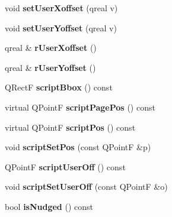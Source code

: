 \begin{DoxyCompactItemize}
\item 
\mbox{\label{class_ms_1_1_element_aca6f405281ab38a390561198ec0c6b19}} 
void {\bfseries set\+User\+Xoffset} (qreal v)
\item 
\mbox{\label{class_ms_1_1_element_a977093e21a1f1e361992ba095ba1359f}} 
void {\bfseries set\+User\+Yoffset} (qreal v)
\item 
\mbox{\label{class_ms_1_1_element_aab6ba028de833b5255ca6402e769d9a0}} 
qreal \& {\bfseries r\+User\+Xoffset} ()
\item 
\mbox{\label{class_ms_1_1_element_ac3a76ec2d191286d792e43e717791c08}} 
qreal \& {\bfseries r\+User\+Yoffset} ()
\item 
\mbox{\label{class_ms_1_1_element_ad7481f119f9cbef134cfb25edb05ec1d}} 
Q\+RectF {\bfseries script\+Bbox} () const
\item 
\mbox{\label{class_ms_1_1_element_a6eb0b7ce45672411a219b760d0854f25}} 
virtual Q\+PointF {\bfseries script\+Page\+Pos} () const
\item 
\mbox{\label{class_ms_1_1_element_a1b18a9698567497d88954e5ce75087bc}} 
virtual Q\+PointF {\bfseries script\+Pos} () const
\item 
\mbox{\label{class_ms_1_1_element_a084b1d2f0ff6b5779bc3fcdf3c7081b4}} 
void {\bfseries script\+Set\+Pos} (const Q\+PointF \&p)
\item 
\mbox{\label{class_ms_1_1_element_a04af0ab258637369798d94a85364b021}} 
Q\+PointF {\bfseries script\+User\+Off} () const
\item 
\mbox{\label{class_ms_1_1_element_aa9461a0abb634998802ed4525ae80726}} 
void {\bfseries script\+Set\+User\+Off} (const Q\+PointF \&o)
\item 
\mbox{\label{class_ms_1_1_element_a592da9bef8f5ea3c9840931e8db5f6f6}} 
bool {\bfseries is\+Nudged} () const
\item 

\end{DoxyCompactItemize}
